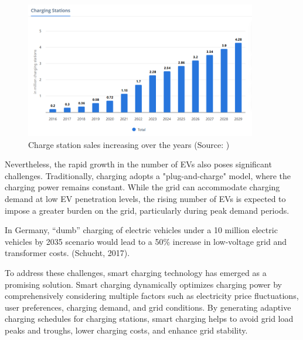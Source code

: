\documentclass[
	english,
	ruledheaders=section,%
	class=report,%
	thesis={type=Report},%
	accentcolor=9c,%
	custommargins=true,%
	marginpar=false,%
	parskip=half-,%
	fontsize=11pt,%
	logofile={img/tuda_logo.pdf}, %
]{tudapub}
\begin{document}
\begin{figure}[H]
    \centering
    \includegraphics[width=0.9\textwidth]{img/CS increasing statistik.jpg} 
    \caption{Charge station sales increasing over the years
    (Source: \cite{EAutostatistik})}
    \label{fig: CSincreasing}
\end{figure}

Nevertheless, the rapid growth in the number of \ac{EV}s also poses significant challenges. Traditionally, charging adopts a "plug-and-charge" model, where the charging power remains constant. While the grid can accommodate charging demand at low \ac{EV} penetration levels, the rising number of \ac{EV}s is expected to impose a greater burden on the grid, particularly during peak demand periods.

In Germany, “dumb” charging of electric vehicles under a 10 million electric vehicles by 2035 scenario would lead to a 50\% increase in low-voltage grid and transformer costs. (Schucht, 2017)\cite{innovationOutlookSmartChargingForEV}.

To address these challenges, smart charging technology has emerged as a promising solution. Smart charging dynamically optimizes charging power by comprehensively considering multiple factors such as electricity price fluctuations, user preferences, charging demand, and grid conditions. By generating adaptive charging schedules for charging stations, smart charging helps to avoid grid load peaks and troughs, lower charging costs, and enhance grid stability.
\end{document}
